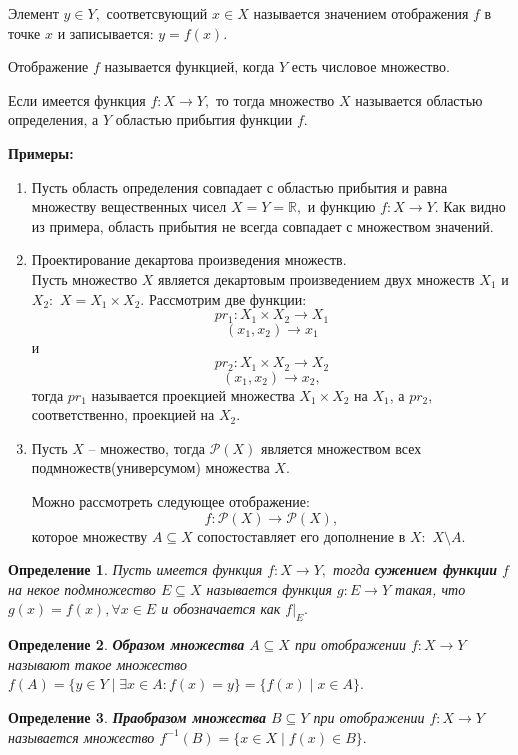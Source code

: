 \documentclass{article}
\newtheorem{Definition}{Определение}[section]
\begin{document}
Элемент $y\in Y,$ соответсвующий $x\in X$ называется значением отображения $f$ в точке $x$ и записывается: $y=f(x).$

Отображение $f$ называется функцией, когда $Y$ есть числовое множество.

Если имеется функция $f:X \rightarrow Y,$ то тогда множество $X$ называется областью определения, а $Y$ областью прибытия функции $f.$

\par\medskip \textbf{Примеры:}
\begin{enumerate}
\item Пусть область определения совпадает с областью прибытия и равна множеству вещественных чисел $X=Y=\mathbb{R},$ и функцию $f:X \rightarrow Y.$ Как видно из примера, область прибытия не всегда совпадает с множеством значений.
\item Проектирование декартова произведения множеств.
\\Пусть множество $X$ является декартовым произведением двух множеств $X_1$ и $X_2:$ $X=X_1 \times X_2.$ Рассмотрим две функции: $$pr_1:X_1\times X_2 \rightarrow X_1$$
$$(x_1,x_2) \rightarrow x_1$$
и $$pr_2:X_1\times X_2 \rightarrow X_2$$
$$(x_1,x_2) \rightarrow x_2,$$
тогда $pr_1$ называется проекцией множества $X_1\times X_2$ на $X_1$, а $pr_2$, соответственно, проекцией на $X_2.$
\item Пусть $X$ -- множество, тогда $\mathcal{P}(X)$ является множеством всех подмножеств(универсумом) множества $X.$

Можно рассмотреть следующее отображение: $$f:\mathcal{P}(X) \rightarrow \mathcal{P}(X),$$ которое множеству $A\subseteq X$ сопостоставляет его дополнение в $X:$ $X\setminus A.$
\end{enumerate}

\begin{Definition}
Пусть имеется функция $f:X \rightarrow Y,$ тогда {\bf сужением функции} $f$ на некое подмножество $E\subseteq X$ называется функция $g:E\rightarrow Y$ такая, что $g(x) = f(x), \forall x\in E$ и обозначается как $f|_{E}.$
\end{Definition}

\begin{Definition}
{\bf Образом множества} $A\subseteq X$ при отображении $f:X \rightarrow Y$ называют такое множество $f(A) = \{y\in Y\mid \exists x\in A: f(x)=y\} = \{f(x)\mid x\in A\}.$
\end{Definition}

\begin{Definition}
{\bf Праобразом множества} $B\subseteq Y$ при отображении $f:X\rightarrow Y$ называется множество $f^{-1}(B) = \{x\in X\mid f(x)\in B\}.$
\end{Definition}
\end{document}
